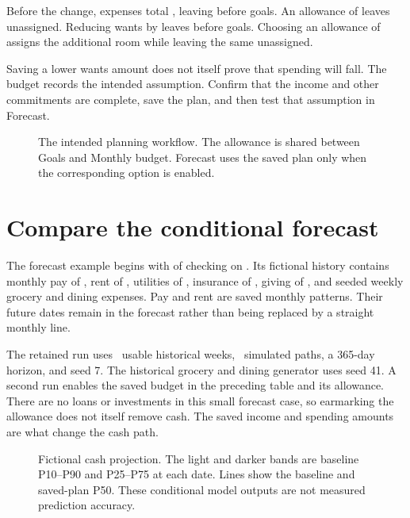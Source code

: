 

Before the change, expenses total , leaving  before goals. An allowance of  leaves  unassigned. Reducing wants by  leaves  before goals. Choosing an allowance of  assigns the additional room while leaving the same  unassigned.

Saving a lower wants amount does not itself prove that spending will fall. The budget records the intended assumption. Confirm that the income and other commitments are complete, save the plan, and then test that assumption in Forecast.

\begin{figure}[htbp]
\centering
\caption{The intended planning workflow. The allowance is shared between Goals and Monthly budget. Forecast uses the saved plan only when the corresponding option is enabled.}
\label{fig:plan-flow}
\end{figure}

\section{Compare the conditional forecast}
The forecast example begins with  of checking on \ExampleDate. Its fictional history contains monthly pay of , rent of , utilities of , insurance of , giving of , and seeded weekly grocery and dining expenses. Pay and rent are saved monthly patterns. Their future dates remain in the forecast rather than being replaced by a straight monthly line.

The retained run uses \ForecastWeeks\ usable historical weeks, \ForecastPaths\ simulated paths, a 365-day horizon, and seed 7. The historical grocery and dining generator uses seed 41. A second run enables the saved budget in the preceding table and its  allowance. There are no loans or investments in this small forecast case, so earmarking the allowance does not itself remove cash. The saved income and spending amounts are what change the cash path.

\begin{figure}[htbp]
\centering
\caption{Fictional cash projection. The light and darker bands are baseline P10--P90 and P25--P75 at each date. Lines show the baseline and saved-plan P50. These conditional model outputs are not measured prediction accuracy.}
\label{fig:forecast-example}
\end{figure}

